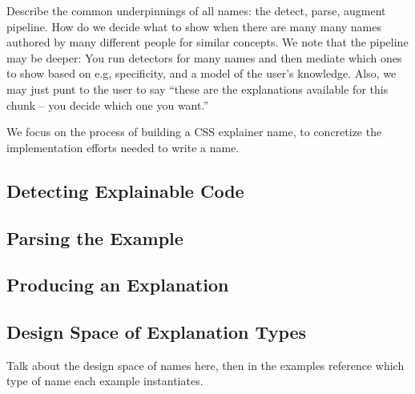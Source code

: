 Describe the common underpinnings of all \glspl{name}: the detect, parse, augment pipeline.
How do we decide what to show when there are many many \glspl{name} authored by many different people for similar concepts.
We note that the pipeline may be deeper:
You run detectors for many \glspl{name} and then mediate which ones to show based on e.g, specificity, and a model of the user’s knowledge.
Also, we may just punt to the user to say ``these are the explanations available for this chunk -- you decide which one you want.''

We focus on the process of building a CSS explainer \gls{name}, to concretize the implementation efforts needed to write a \gls{name}.

\subsection{Detecting Explainable Code}

\subsection{Parsing the Example}

\subsection{Producing an Explanation}


\subsection{Design Space of Explanation Types}


Talk about the design space of \glspl{name} here, then in the examples reference which type of \gls{name} each example instantiates.
